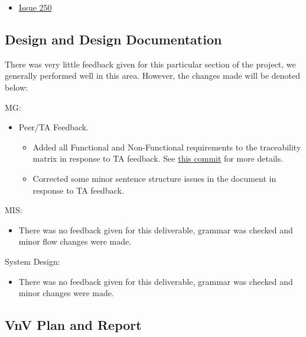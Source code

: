 \documentclass{article}
\begin{document}
\begin{itemize}
    \item \href{https://github.com/davimang/REACH/issues/250}{Issue 250}
\end{itemize}


\subsection{Design and Design Documentation}
There was very little feedback given for this particular section of the project, 
we generally performed well in this area. However, the changes made will be denoted below: \newline

\noindent MG: 
\begin{itemize}
	\item Peer/TA Feedback.
	\begin{itemize}
        \item Added all Functional and Non-Functional requirements to the traceability matrix in response to TA feedback. See \href{https://github.com/davimang/REACH/commit/162c385506c06841df3f04ff52d7041024068870}{this commit} for more details.
        \item Corrected some minor sentence structure issues in the document in response to TA feedback. 
    \end{itemize}
\end{itemize}


MIS:
\begin{itemize}
    \item There was no feedback given for this deliverable, grammar was checked and minor flow changes were made. \newline
\end{itemize}


System Design:
\begin{itemize}
    \item There was no feedback given for this deliverable, grammar was checked and minor changes were made. \newline
\end{itemize}


\subsection{VnV Plan and Report}
\end{document}
